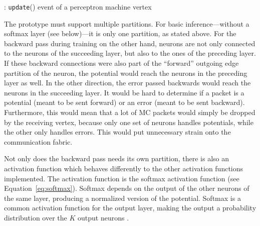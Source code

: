 \documentclass[]{article}
\begin{document}
\begin{algorithm} %
  \caption{: \texttt{update}() event of a perceptron machine vertex}
  \label{alg:update}

  \begin{algorithmic}[1]
      \ENDFOR
    \ENDIF
  \end{algorithmic}
\end{algorithm} %

The prototype must support multiple partitions.
For basic inference---without a softmax layer (see below)---it is only
one partition, as stated above.
For the backward pass during training on the other hand, neurons are
not only connected to the neurons of the succeeding layer, but also
to the ones of the preceding layer.
If these backward connections were also part of the ``forward''
outgoing edge partition of the neuron, the potential would reach the
neurons in the preceding layer as well.
In the other direction, the error passed backwards would reach the
neurons in the succeeding layer.
It would be hard to determine if a packet is a potential (meant to
be sent forward) or an error (meant to be sent backward).
Furthermore, this would mean that a lot of MC packets would simply
be dropped by the receiving vertex, because only one set of neurons
handles potentials, while the other only handles errors.
This would put unnecessary strain onto the communication fabric.

Not only does the backward pass needs its own partition, there is
also an activation function which behaves differently to the other
activation functions implemented.
The activation function is the softmax activation function
(see Equation~\ref{eq:softmax}).
Softmax depends on the output of the other neurons of the same layer,
producing a normalized version of the potential.
Softmax is a common activation function for the output layer, making
the output a probability distribution over the $K$ output neurons
\citep{goodfellow_et_al_2016}.
\end{document}
